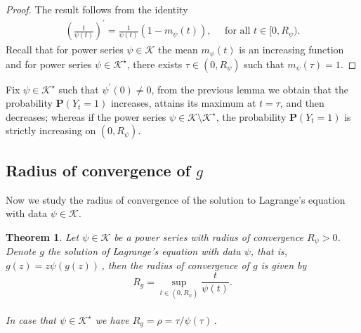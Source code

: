 \documentclass[11pt,a4paper,leqno]{amsart}
\theoremstyle{plain}
\newtheorem{theo}{Theorem}[section]
\theoremstyle{definition}
\numberwithin{equation}{section}
\def\P{\mathbf{P}}
\def\K{\mathcal{K}}
\begin{document}
	\begin{proof}
		The result follows from the identity
		\begin{align*}
			\left(\frac{t}{\psi(t)}\right)^{\prime} = \frac{1}{\psi(t)}(1-m_{\psi}(t)), \quad \text{ for all } t \in [0,R_{\psi}).
		\end{align*}
		Recall that for power series $\psi \in \K$ the mean $m_{\psi}(t)$ is an increasing function and for power series $\psi \in \K^{\star}$, there exists $\tau \in (0,R_{\psi})$ such that $m_{\psi}(\tau) = 1$.
	\end{proof}
	
	Fix $\psi \in \K^{\star}$ such that $\psi^{\prime}(0) \neq 0$, from the previous lemma we obtain that the probability \(\P(Y_t=1)\) increases, attains its maximum at \(t=\tau\), and then decreases; whereas if the power series \(\psi\in\mathcal K\setminus\mathcal K^\star\), the probability \(\P(Y_t=1)\) is strictly increasing on \((0,R_\psi)\).
	
	\subsection{Radius of convergence of $g$} Now we study the radius of convergence of the solution to Lagrange's equation with data $\psi \in \K$.
	
	\begin{theo}\label{thm: radius_g} Let $\psi \in \K$ be a power series with radius of convergence $R_{\psi}>0$. Denote $g$ the solution of Lagrange's equation with data $\psi$, that is, $g(z) = z\psi(g(z))$\,,	
		then the radius of convergence of $g$ is given by 
		\[
		R_g = \sup_{t \in (0,R_{\psi})}\frac{t}{\psi(t)}.
		\]\\[.1 cm]
		In case that $\psi \in \K^{\star}$ we have $R_g = \rho = \tau/\psi(\tau)$\,.
	\end{theo}
	
\end{document}
